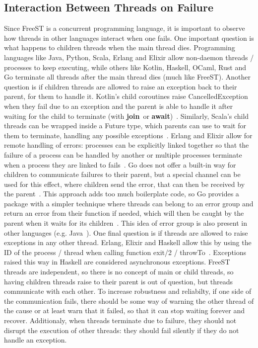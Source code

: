 \documentclass[sigplan]{acmart}
\newcommand{\syntax}[1]{\textbf{#1}}
\newcommand{\joinb}{\syntax{join}}
\newcommand{\awaitb}{\syntax{await}}
\begin{document}
\subsection{Interaction Between Threads on Failure}

Since FreeST is a concurrent programming language, it is important to observe how threads in other languages interact when one fails.
One important question is what happens to children threads when the main thread dies.
Programming languages like Java, Python, Scala, Erlang and Elixir allow non-daemon threads / processes to keep executing, while others like Kotlin, Haskell, OCaml, Rust and Go terminate all threads after the main thread dies (much like FreeST).
Another question is if children threads are allowed to raise an exception back to their parent, for them to handle it.
Kotlin's child coroutines raise CancelledException when they fail due to an exception and the parent is able to handle it after waiting for the child to terminate (with \joinb~or \awaitb)~\cite{kotlinbook,kotlincoroutineseh}.
Similarly, Scala's child threads can be wrapped inside a Future type, which parents can use to wait for them to terminate, handling any possible exceptions~\cite{scalabookfutures}.
Erlang and Elixir allow for remote handling of errors: processes can be explicitly linked together so that the failure of a process can be handled by another or multiple processes terminate when a process they are linked to fails~\cite{erlangbookprocesses,erlangprocesses,elixirbookprocesses,elixirprocesses}.
Go does not offer a built-in way for children to communicate failures to their parent, but a special channel can be used for this effect, where children send the error, that can then be received by the parent~\cite{gochannelseh}.
This approach adds too much boilerplate code, so Go provides a package with a simpler technique where threads can belong to an error group and return an error from their function if needed, which will then be caught by the parent when it waits for its children~\cite{gochannelseh,goerrgroupeh}.
This idea of error group is also present in other languages (e.g. Java~\cite{ehthreads}).
One final question is if threads are allowed to raise exceptions in any other thread.
Erlang, Elixir and Haskell allow this by using the ID of the process / thread when calling function exit/2 / throwTo~\cite{erlangbookprocesses,elixirexit,haskelleh}.
Exceptions raised this way in Haskell are considered asynchronous exceptions.
FreeST threads are independent, so there is no concept of main or child threads, so having children threads raise to their parent is out of question, but threads communicate with each other.
To increase robustness and reliabilty, if one side of the communication fails, there should be some way of warning the other thread of the cause or at least warn that it failed, so that it can stop waiting forever and recover.
Additionaly, when threads terminate due to failure, they should not disrupt the execution of other threads: they should fail silently if they do not handle an exception.
\end{document}
